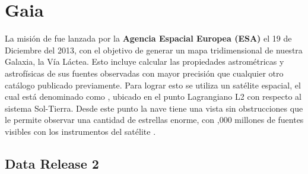 \section{Gaia} \label{muestra:sec:gaia}

La misión de \gaia fue lanzada por la \textbf{Agencia Espacial Europea (ESA)} el 19 de Diciembre del 2013, con el objetivo de generar un mapa tridimensional de nuestra Galaxia, la Vía Láctea. Esto incluye calcular las propiedades astrométricas y astrofísicas de sus fuentes observadas con mayor precisión que cualquier otro catálogo publicado previamente. Para lograr esto se utiliza un satélite espacial, el cual está denominado como \gaiaNoSpace, ubicado en el punto Lagrangiano L2 con respecto al sistema Sol-Tierra. Desde este punto la nave tiene una vista sin obstrucciones que le permite observar una cantidad de estrellas enorme, con ,000 millones de fuentes visibles con los instrumentos del satélite \gaiaNoSpace. \citet*{gaiaMission}

\subsection{Data Release 2} \label{muestra:sec:gaia:dr2}
